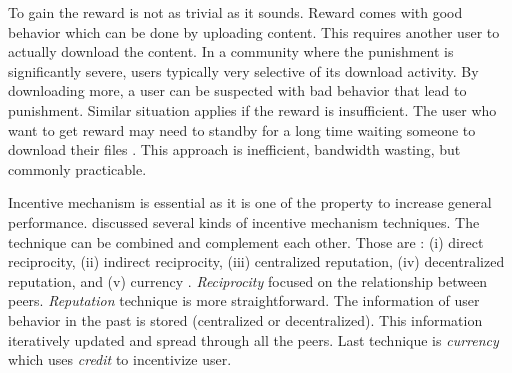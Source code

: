 To gain the reward is not as trivial as it sounds. Reward comes with good behavior which can be done by uploading content. This requires another user to actually download the content. In a community where the punishment is significantly severe, users typically very selective of its download activity. By downloading more, a user can be suspected with bad behavior that lead to punishment. Similar situation applies if the reward is insufficient. The user who want to get reward may need to standby for a long time waiting someone to download their files \cite{2013:survivepriv:jia}. This approach is inefficient, bandwidth wasting, but commonly practicable\cite{2013:survivepriv:jia}.

Incentive mechanism is essential as it is one of the property to increase general performance. \citeauthor{2011:managesupplydemand:meulpolder} discussed several kinds of incentive mechanism techniques. The technique can be combined and complement each other. Those are : (i) direct reciprocity, (ii) indirect reciprocity, (iii) centralized reputation, (iv) decentralized reputation, and (v) currency \cite{2011:managesupplydemand:meulpolder}. \textit{Reciprocity} focused on the relationship between peers.  \textit{Reputation} technique is more straightforward. The information of user behavior in the past is stored (centralized or decentralized). This information iteratively updated and spread through all the peers. Last technique is \textit{currency} which uses \textit{credit} to incentivize user.


